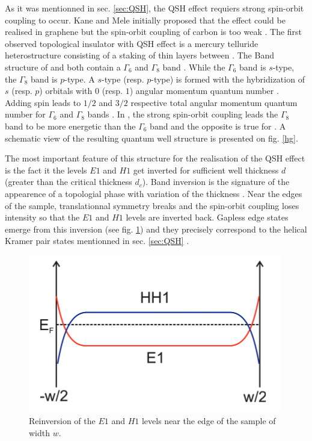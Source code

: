 

As it was mentionned in sec. \ref{sec:QSH}, the QSH effect requiers strong spin-orbit coupling to occur. Kane and Mele initially proposed that the effect could be realised in graphene but the spin-orbit coupling of carbon is too weak \cite{cayssol_topological_2021}. The first observed topological insulator with QSH effect is a mercury telluride heterostructure consisting of a staking of thin  layers between  \cite{kane_this_2011}. The Band structure of  and  both contain a $\Gamma_6$ and $\Gamma_8$ band \cite{bernevig_topological_2013}. While the $\Gamma_6$ band is $s$-type, the $\Gamma_8$ band is $p$-type. A $s$-type (resp. $p$-type) is formed with the hybridization of $s$ (resp. $p$) orbitals with $0$ (resp. $1$) angular momentum quantum number \cite{girvin_modern_2019}. Adding spin leads to $1/2$ and $3/2$ respective total angular momentum quantum number for $\Gamma_6$ and $\Gamma_8$ bands \cite{bernevig_topological_2013}. In , the strong spin-orbit coupling leads the $\Gamma_8$ band to be more energetic than the $\Gamma_6$ band and the opposite is true for  \cite{buhmann_quantum_2011}. A schematic view of the resulting quantum well structure is presented on fig. \ref{hg}.


The most important feature of this structure for the realisation of the QSH effect is the fact it the levels $E1$ and $H1$ get inverted for sufficient well thickness $d$ (greater than the critical thickness $d_c$). Band inversion is the signature of the appearence of a topologial phase with variation of the thickness \cite{bansil_colloquium_2016}. Near the edges of the sample, translationnal symmetry breaks and the spin-orbit coupling loses intensity so that the $E1$ and $H1$ levels are inverted back. Gapless edge states emerge from this inversion (see fig. \ref{cross}) and they precisely correspond to the helical Kramer pair states mentionned in sec. \ref{sec:QSH} \cite{buhmann_quantum_2011}.  

\begin{figure}[h!]
    \includegraphics[width=\columnwidth]{sections/visuel/cross}
    \centering
    \caption{Reinversion of the $E1$ and $H1$ levels near the edge of the sample of width $w$.}
    \label{cross}
\end{figure}